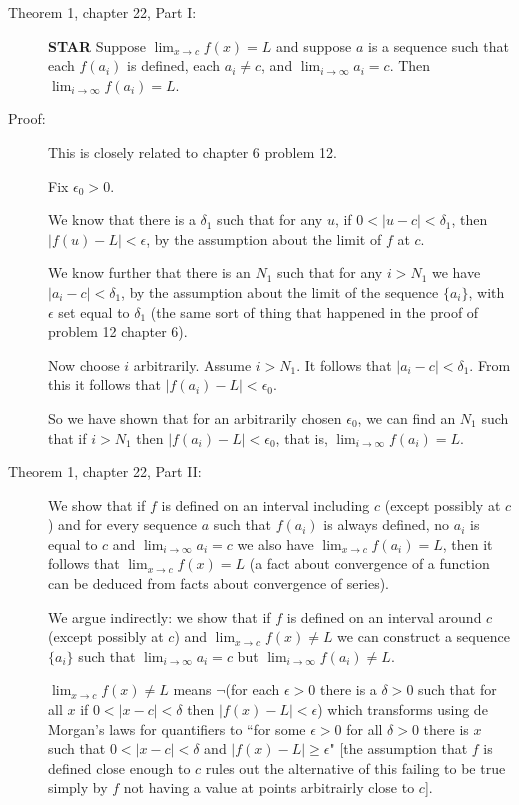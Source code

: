 \documentclass[12pt]{article}
\begin{document}
\begin{description}

\item[Theorem 1, chapter 22, Part I:]  {\bf STAR}  Suppose $\lim_{x \rightarrow c}f(x)=L$ and suppose $a$ is a sequence such that each $f(a_i)$ is defined, each $a_i \neq c$, and $\lim_{i \rightarrow \infty}a_i = c$.  Then $\lim_{i \rightarrow \infty}f(a_i)=L$.

\item[Proof:]  This is closely related to chapter 6 problem 12.

Fix $\epsilon_0>0$.

We know that there is a $\delta_1$ such that for any $u$, if $0<|u-c|<\delta_1$, then $|f(u)-L|<\epsilon$, by the assumption about the limit of $f$ at $c$.

We know further that there is an $N_1$ such that for any $i>N_1$ we have $|a_i-c|<\delta_1$, by the assumption about the limit of the sequence $\{a_i\}$, with $\epsilon$ set equal to $\delta_1$ (the same sort of thing that happened in the proof of problem 12 chapter 6).

Now choose $i$ arbitrarily.  Assume $i>N_1$.  It follows that $|a_i-c|<\delta_1$.  From this it follows that $|f(a_i)-L|<\epsilon_0$.

So we have shown that for an arbitrarily chosen $\epsilon_0$, we can find an $N_1$ such that if $i>N_1$ then $|f(a_i)-L|<\epsilon_0$, that is, $\lim_{i \rightarrow \infty}f(a_i)=L$.


\item[Theorem 1, chapter 22, Part II:]  

We show that if $f$ is defined on an interval including $c$ (except possibly at $c$) and for every sequence $a$ such that $f(a_i)$ is always defined, no $a_i$ is equal to $c$ and $\lim_{i \rightarrow \infty}a_i=c$ we also have
$\lim_{x \rightarrow c}f(a_i)=L$, then it follows that $\lim_{x \rightarrow c}f(x)=L$ (a fact about convergence of a function can be deduced from facts about convergence of series).

We argue indirectly:  we show that if $f$ is defined on an interval around $c$ (except possibly at $c$)  and $\lim_{x \rightarrow c}f(x)\neq L$ we can construct a sequence $\{a_i\}$ such that $\lim_{i \rightarrow \infty}a_i = c$ but $\lim_{i \rightarrow \infty}f(a_i) \neq L$.

 $\lim_{x \rightarrow c}f(x)\neq L$ means $\neg$(for each $\epsilon>0$ there is a $\delta>0$ such that for all $x$ if $0<|x-c|<\delta$ then $|f(x)-L|<\epsilon$)
which transforms using de Morgan's laws for quantifiers to  ``for some $\epsilon>0$ for all $\delta>0$ there is $x$ such that $0<|x-c|<\delta$ and $|f(x)-L|\geq \epsilon$"  [the assumption that $f$ is defined close enough to $c$ rules out the alternative of this failing to be true simply by $f$ not having a value at points arbitrairly close to $c$].


\end{description}
\end{document}
